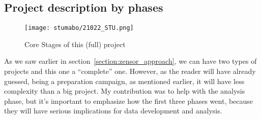 \subsection{Project description by phases}
\begin{figure}[ht]
    \texttt{[image: stumabo/21022\_STU.png]}
    \caption{Core Stages of this (full) project}
    \label{fig:stumabo_stages}
\end{figure}
As we saw earlier in section~\ref{section:zensor_approach}, we can have two types of projects and this one a ``complete'' one. 
However, as the reader will have already guessed, being a preparation campaign, as mentioned earlier, it will have less complexity than a big project.
My contribution was to help with the analysis phase, but it's important to emphasize how the first three phases went, because they will have serious implications for data development and analysis.



